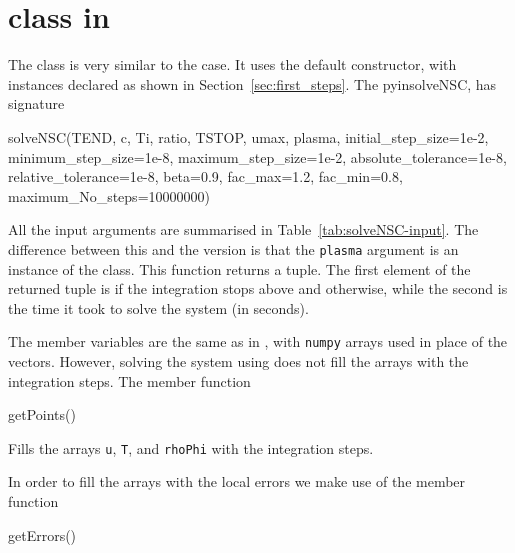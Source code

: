 \documentclass[11pt,a4paper]{article}
\begin{document}

\section{ class in \PY }\label{app:py}
\setcounter{equation}{0}
The  class is very similar to the \CPP case. It uses the default constructor, with instances declared as shown in Section~\ref{sec:first_steps}. The pyin{solveNSC}, has signature
%
\begin{cpp}
	solveNSC(TEND, c, Ti, ratio, TSTOP, umax, plasma, 
			initial_step_size=1e-2, minimum_step_size=1e-8, maximum_step_size=1e-2, 
			absolute_tolerance=1e-8, relative_tolerance=1e-8, beta=0.9, fac_max=1.2, fac_min=0.8,
			maximum_No_steps=10000000)
\end{cpp}

%
All the input arguments are summarised in Table~\ref{tab:solveNSC-input}. The difference between this and the \CPP version is that the {\tt plasma} argument is an instance of the \PY {} class. 
%
This function returns a tuple. The first element of the returned tuple is  if the integration stops above  and  otherwise, while the second is the time it took to solve the system (in seconds).

The member variables are the same as in \CPP, with {\tt numpy} arrays used in place of the \CPP vectors. However, solving the system using  does not fill the arrays with the integration steps. The member function
%
\begin{py}
	getPoints()
\end{py}
%
Fills the arrays {\tt u}, {\tt T}, and {\tt rhoPhi} with the integration steps.


In order to fill the arrays with the local errors we make use of the member function
%
\begin{py}
	getErrors()
\end{py}
\end{document}
